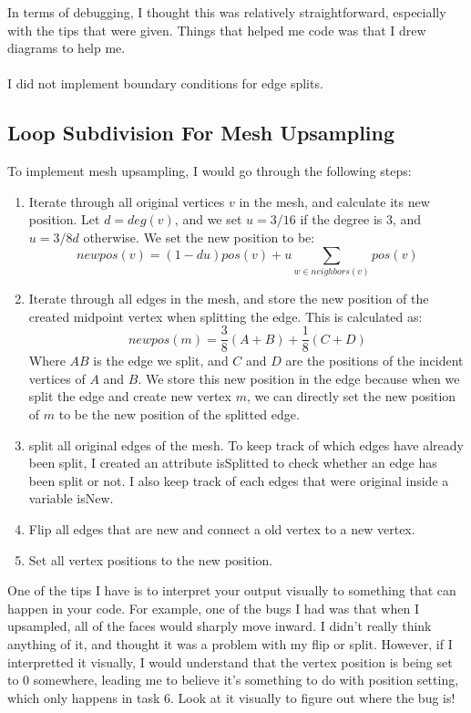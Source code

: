 \documentclass{article}
\begin{document}
In terms of debugging, I thought this was relatively straightforward, especially with the tips that were given. Things that helped me code was that I drew diagrams to help me.
\\
\\
I did not implement boundary conditions for edge splits.
\subsection{Loop Subdivision For Mesh Upsampling}
To implement mesh upsampling, I would go through the following steps:
\begin{enumerate}
    \item Iterate through all original vertices $v$ in the mesh, and calculate its new position. Let $d = deg(v)$, and we set $u = 3/16$ if the degree is 3, and $u = 3/8d$ otherwise. We set the new position to be:
    $$newpos(v) = (1 - du)pos(v) + u\sum_{w 
    \in neighbors(v)} pos(v)$$

    \item Iterate through all edges in the mesh, and store the new position of the created midpoint vertex when splitting the edge. This is calculated as:
    $$newpos(m) = \frac{3}{8}(A + B) + \frac{1}{8}(C + D)$$
    Where $AB$ is the edge we split, and $C$ and $D$ are the positions of the incident vertices of $A$ and $B$. We store this new position in the edge because when we split the edge and create new vertex $m$, we can directly set the new position of $m$ to be the new position of the splitted edge.

    \item split all original edges of the mesh. To keep track of which edges have already been split, I created an attribute isSplitted to check whether an edge has been split or not. I also keep track of each edges that were original inside a variable isNew.

    \item Flip all edges that are new and connect a old vertex to a new vertex.

    \item Set all vertex positions to the new position.
\end{enumerate}
One of the tips I have is to interpret your output visually to something that can happen in your code. For example, one of the bugs I had was that when I upsampled, all of the faces would sharply move inward. I didn't really think anything of it, and thought it was a problem with my flip or split. However, if I interpretted it visually, I would understand that the vertex position is being set to 0 somewhere, leading me to believe it's something to do with position setting, which only happens in task 6. Look at it visually to figure out where the bug is!
\end{document}
